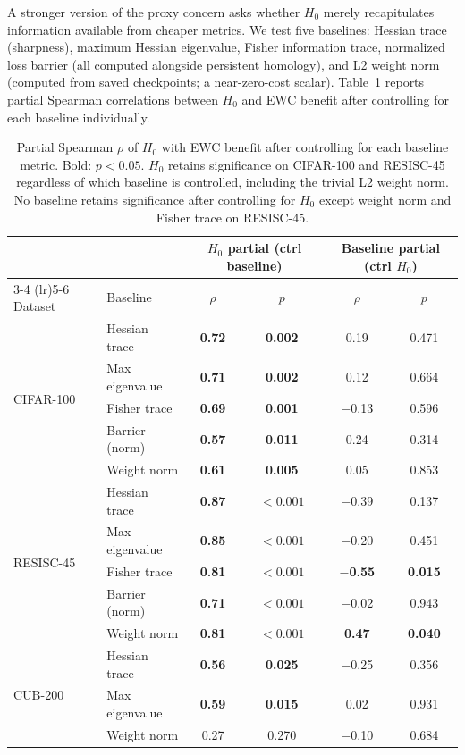 \documentclass{article}
\begin{document}
A stronger version of the proxy concern asks whether $H_0$ merely recapitulates information available from cheaper metrics. We test five baselines: Hessian trace (sharpness), maximum Hessian eigenvalue, Fisher information trace, normalized loss barrier (all computed alongside persistent homology), and L2 weight norm (computed from saved checkpoints; a near-zero-cost scalar). Table~\ref{tab:baselines} reports partial Spearman correlations between $H_0$ and EWC benefit after controlling for each baseline individually.

\begin{table}[t]
\centering
\caption{Partial Spearman $\rho$ of $H_0$ with EWC benefit after controlling for each baseline metric. Bold: $p < 0.05$. $H_0$ retains significance on CIFAR-100 and RESISC-45 regardless of which baseline is controlled, including the trivial L2 weight norm. No baseline retains significance after controlling for $H_0$ except weight norm and Fisher trace on RESISC-45.}
\label{tab:baselines}
\small
\begin{tabular}{@{}llcccc@{}}
\toprule
& & \multicolumn{2}{c}{$H_0$ partial (ctrl baseline)} & \multicolumn{2}{c}{Baseline partial (ctrl $H_0$)} \\
\cmidrule(lr){3-4} \cmidrule(lr){5-6}
Dataset & Baseline & $\rho$ & $p$ & $\rho$ & $p$ \\
\midrule
\multirow{5}{*}{CIFAR-100}
  & Hessian trace  & \textbf{0.72} & \textbf{0.002} & 0.19 & 0.471 \\
  & Max eigenvalue & \textbf{0.71} & \textbf{0.002} & 0.12 & 0.664 \\
  & Fisher trace   & \textbf{0.69} & \textbf{0.001} & $-$0.13 & 0.596 \\
  & Barrier (norm) & \textbf{0.57} & \textbf{0.011} & 0.24 & 0.314 \\
  & Weight norm    & \textbf{0.61} & \textbf{0.005} & 0.05 & 0.853 \\
\midrule
\multirow{5}{*}{RESISC-45}
  & Hessian trace  & \textbf{0.87} & $\mathbf{< 0.001}$ & $-$0.39 & 0.137 \\
  & Max eigenvalue & \textbf{0.85} & $\mathbf{< 0.001}$ & $-$0.20 & 0.451 \\
  & Fisher trace   & \textbf{0.81} & $\mathbf{< 0.001}$ & \textbf{$-$0.55} & \textbf{0.015} \\
  & Barrier (norm) & \textbf{0.71} & $\mathbf{< 0.001}$ & $-$0.02 & 0.943 \\
  & Weight norm    & \textbf{0.81} & $\mathbf{< 0.001}$ & \textbf{0.47} & \textbf{0.040} \\
\midrule
\multirow{3}{*}{CUB-200}
  & Hessian trace  & \textbf{0.56} & \textbf{0.025} & $-$0.25 & 0.356 \\
  & Max eigenvalue & \textbf{0.59} & \textbf{0.015} & 0.02 & 0.931 \\
  & Weight norm    & 0.27 & 0.270 & $-$0.10 & 0.684 \\
\bottomrule
\end{tabular}
\end{table}
\end{document}
